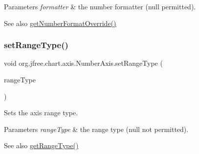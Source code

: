 \begin{DoxyParams}{Parameters}
{\em formatter} & the number formatter ({\ttfamily null} permitted).\\
\hline
\end{DoxyParams}
\begin{DoxySeeAlso}{See also}
\mbox{\hyperlink{classorg_1_1jfree_1_1chart_1_1axis_1_1_number_axis_a0a7a84fa0f916b12d3f1605f6e6ea394}{get\+Number\+Format\+Override()}} 
\end{DoxySeeAlso}
\mbox{\label{classorg_1_1jfree_1_1chart_1_1axis_1_1_number_axis_a6636f7ceef2cafa5230d718b195e96d1}} 
\subsubsection{\texorpdfstring{set\+Range\+Type()}{setRangeType()}}
{\footnotesize\ttfamily void org.\+jfree.\+chart.\+axis.\+Number\+Axis.\+set\+Range\+Type (\begin{DoxyParamCaption}\item[{\mbox{\hyperlink{classorg_1_1jfree_1_1data_1_1_range_type}{Range\+Type}}}]{range\+Type }\end{DoxyParamCaption})}

Sets the axis range type.


\begin{DoxyParams}{Parameters}
{\em range\+Type} & the range type ({\ttfamily null} not permitted).\\
\hline
\end{DoxyParams}
\begin{DoxySeeAlso}{See also}
\mbox{\hyperlink{classorg_1_1jfree_1_1chart_1_1axis_1_1_number_axis_a94094757ebaf3ace59f591e033da1144}{get\+Range\+Type()}} 
\end{DoxySeeAlso}
\mbox{\label{classorg_1_1jfree_1_1chart_1_1axis_1_1_number_axis_a0990c55ae7683e249177ce3382ddc2e3}} 
